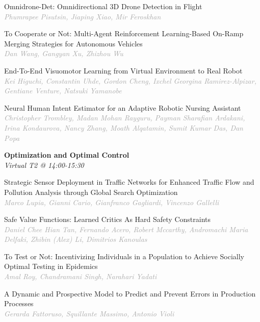 \begin{multicols*}{2}
\small Omnidrone-Det: Omnidirectional 3D Drone Detection in Flight\\ 
\footnotesize \textcolor{darkgray}{\textit{Phumrapee Pisutsin, Jiaping  Xiao, Mir  Feroskhan}}

\small To Cooperate or Not: Multi-Agent Reinforcement Learning-Based On-Ramp Merging Strategies for Autonomous Vehicles\\ 
\footnotesize \textcolor{darkgray}{\textit{Dan Wang, Gangyan  Xu, Zhizhou  Wu}}

\small End-To-End Visuomotor Learning from Virtual Environment to Real Robot\\ 
\footnotesize \textcolor{darkgray}{\textit{Kei Higuchi, Constantin  Uhde, Gordon  Cheng, Ixchel Georgina  Ramirez-Alpizar, Gentiane  Venture, Natsuki  Yamanobe}}

\small Neural Human Intent Estimator for an Adaptive Robotic Nursing Assistant\\ 
\footnotesize \textcolor{darkgray}{\textit{Christopher Trombley, Madan Mohan  Rayguru, Payman  Sharafian Ardakani, Irina  Kondaurova, Nancy  Zhang, Moath  Alqatamin, Sumit Kumar  Das, Dan  Popa}}

\normalsize \textbf{Optimization and Optimal Control}\\
\small \textit{Virtual T2 @ 14:00-15:30}

\small Strategic Sensor Deployment in Traffic Networks for Enhanced Traffic Flow and Pollution Analysis through Global Search Optimization\\ 
\footnotesize \textcolor{darkgray}{\textit{Marco Lupia, Gianni  Cario, Gianfranco  Gagliardi, Vincenzo  Gallelli}}

\small Safe Value Functions: Learned Critics As Hard Safety Constraints\\ 
\footnotesize \textcolor{darkgray}{\textit{Daniel Chee Hian Tan, Fernando  Acero, Robert  Mccarthy, Andromachi Maria  Delfaki, Zhibin (Alex)  Li, Dimitrios  Kanoulas}}

\small To Test or Not: Incentivizing Individuals in a Population to Achieve Socially Optimal Testing in Epidemics\\ 
\footnotesize \textcolor{darkgray}{\textit{Amal Roy, Chandramani  Singh, Narahari  Yadati}}

\small A Dynamic and Prospective Model to Predict and Prevent Errors in Production Processes\\ 
\footnotesize \textcolor{darkgray}{\textit{Gerarda Fattoruso, Squillante  Massimo, Antonio  Violi}}


\end{multicols*}
